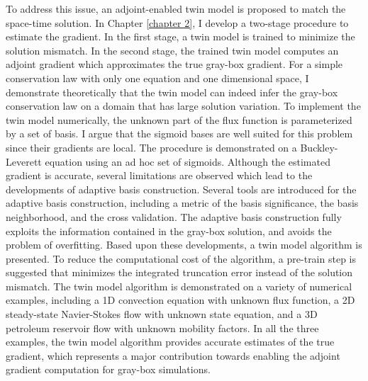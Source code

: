 To address this issue, an adjoint-enabled twin model is proposed 
to match the space-time solution.
In Chapter \ref{chapter 2}, I develop a two-stage procedure to estimate the gradient.
In the first stage, a twin model is trained to minimize the solution mismatch.
In the second stage, the trained twin model
computes an adjoint gradient which approximates the true gray-box gradient.
For a simple conservation law with only one equation and one dimensional space,
I demonstrate theoretically that the twin model can indeed infer the gray-box 
conservation law on a domain that has large solution variation.
To implement the twin model numerically,
the unknown part of the flux function is parameterized by a set of basis.
I argue that the sigmoid bases are well suited for this problem since
their gradients are local. The procedure is demonstrated
on a Buckley-Leverett equation using an ad hoc set of sigmoids.
Although the estimated gradient is accurate, several limitations are observed
which lead to the developments of adaptive basis construction.
Several tools are introduced for the adaptive basis construction,
including a metric of the basis significance, the basis neighborhood, 
and the cross validation.
The adaptive basis construction 
fully exploits the information contained in the
gray-box solution, and avoids the problem of overfitting.
Based upon these developments, a twin model algorithm is presented.
To reduce the computational cost of the algorithm, a pre-train step is suggested
that minimizes the integrated truncation error instead of the solution mismatch.
The twin model algorithm is demonstrated on 
a variety of numerical examples, including a 1D convection equation with unknown 
flux function, a 2D steady-state Navier-Stokes flow with unknown state equation,
and a 3D petroleum reservoir flow with unknown mobility factors.
In all the three examples, the twin model algorithm provides accurate estimates
of the true gradient, which represents a major contribution towards enabling the
adjoint gradient computation for gray-box simulations.\\

